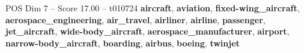 \begin{textsample}{POS Dim 7 – Score 17.00 – t010724}  \label{ex:f7_pos_025}
\textbf{aircraft}, \textbf{aviation}, \textbf{fixed-wing\_aircraft}, \textbf{aerospace\_engineering}, \textbf{air\_travel}, \textbf{airliner}, \textbf{airline}, \textbf{passenger}, \textbf{jet\_aircraft}, \textbf{wide-body\_aircraft}, \textbf{aerospace\_manufacturer}, \textbf{airport}, \textbf{narrow-body\_aircraft}, \textbf{boarding}, \textbf{airbus}, \textbf{boeing}, \textbf{twinjet}

\end{textsample}

